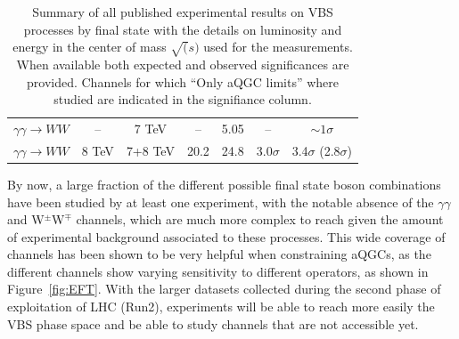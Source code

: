 \begin{table}[htb]
\begin{tabular}{|l|c|c|c|c|c|c|}
    $\gamma\gamma\rightarrow WW$ & --                    & 7 TeV   & --    & 5.05 & --                                                                & $\sim 1\sigma$ \cite{Chatrchyan:2013akv}             \\
    $\gamma\gamma\rightarrow WW$ & 8 TeV                 & 7+8 TeV & 20.2  & 24.8 & 3.0$\sigma$ \cite{Aaboud:2016dkv}                                 & 3.4$\sigma$ (2.8$\sigma$) \cite{Khachatryan:2016mud} \\
    \hline
  \end{tabular}
\caption{\label{tab:wg2:expres} Summary of all published experimental results on VBS processes by final state with the details on luminosity and energy in the center of mass $\sqrt(s)$ used for the measurements. When available both expected and observed significances are provided. Channels for which ``Only aQGC limits'' where studied are indicated in the signifiance column.}
\end{table}

By now, a large fraction of the different possible final state boson combinations have been studied by at least one experiment, with the notable absence of the $\gamma\gamma$ and W$^\pm$W$^\mp$ channels, which are much more complex to reach given the amount of experimental background associated to these processes. This wide coverage of channels has been shown to be very helpful when constraining aQGCs, as the different channels show varying sensitivity to different operators, as shown in Figure~\ref{fig:EFT}.
With the larger datasets collected during the second phase of exploitation of LHC (Run2), experiments will be able to reach more easily the VBS phase space and be able to study channels that are not accessible yet.

